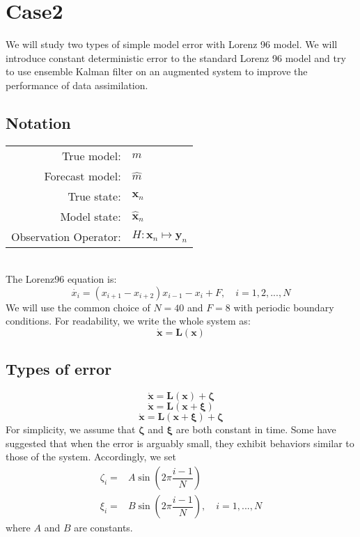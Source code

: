\documentclass{article}
\begin{document}
\section{Case2}
We will study two types of simple model error with Lorenz 96 model. We will introduce constant deterministic error to the standard Lorenz 96 model and try to use ensemble Kalman filter on an augmented system to improve the performance of data assimilation.
\subsection{Notation}
\begin{tabular}{rl}
True model:& $m$\\
Forecast model:& $\hat{m}$\\
True state:& $\pmb{x}_n$\\
Model state:& $\hat{\pmb{x}}_n$\\
Observation Operator:& $H:\pmb{x}_n\mapsto\pmb{y}_n$
\end{tabular}\\
The Lorenz96 equation is:
\begin{equation}
\dot{x_i}=(x_{i+1}-x_{i+2})x_{i-1}-x_{i}+F,\quad i=1,2,...,N
\end{equation}
We will use the common choice of $N=40$ and $F=8$ with periodic boundary conditions. For readability, we write the whole system as:
\begin{equation}
\pmb{\dot{x}}=\mathbf{L(x)}
\end{equation}
\subsection{Types of error}
\begin{equation}
\dot{\pmb{x}}=\pmb{L}(\pmb{x})+\pmb{\zeta}
\end{equation}
\begin{equation}
\dot{\pmb{x}}=\pmb{L}(\pmb{x}+\pmb{\xi})
\end{equation}
\begin{equation}
\dot{\pmb{x}}=\pmb{L}(\pmb{x}+\pmb{\xi})+\pmb{\zeta}
\end{equation}
For simplicity, we assume that $\pmb{\zeta}$ and $\pmb{\xi}$ are both constant in time. Some have suggested that when the error is arguably small, they exhibit behaviors similar to those of the system. Accordingly, we set
\begin{align}
\zeta_i=&A\sin(2\pi\dfrac{i-1}{N})\\
\xi_i=&B\sin(2\pi\dfrac{i-1}{N}),\quad i=1,...,N
\end{align}
where $A$ and $B$ are constants.
\end{document}
